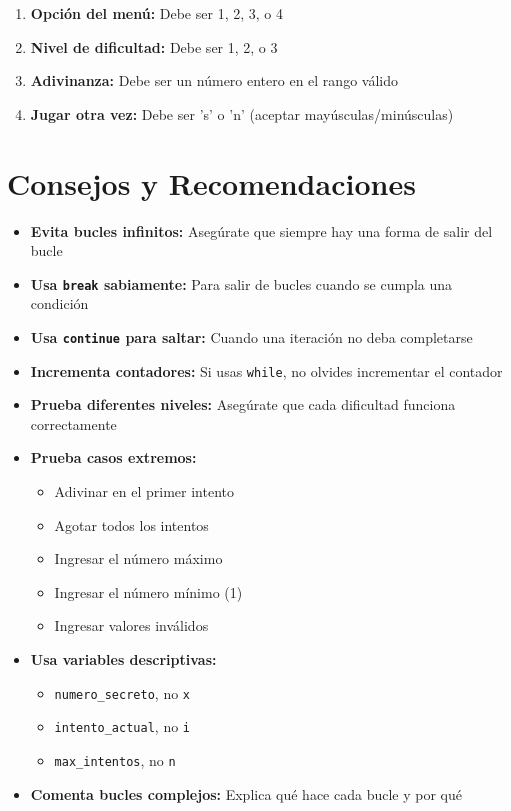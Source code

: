 \documentclass[12pt,a4paper]{article}
\begin{document}
\begin{enumerate}[leftmargin=*]
    \item \textbf{Opción del menú:} Debe ser 1, 2, 3, o 4
    \item \textbf{Nivel de dificultad:} Debe ser 1, 2, o 3
    \item \textbf{Adivinanza:} Debe ser un número entero en el rango válido
    \item \textbf{Jugar otra vez:} Debe ser 's' o 'n' (aceptar mayúsculas/minúsculas)
\end{enumerate}

\section{Consejos y Recomendaciones}

\begin{itemize}[leftmargin=*]
    \item \textbf{Evita bucles infinitos:} Asegúrate que siempre hay una forma de salir del bucle
    
    \item \textbf{Usa \texttt{break} sabiamente:} Para salir de bucles cuando se cumpla una condición
    
    \item \textbf{Usa \texttt{continue} para saltar:} Cuando una iteración no deba completarse
    
    \item \textbf{Incrementa contadores:} Si usas \texttt{while}, no olvides incrementar el contador
    
    \item \textbf{Prueba diferentes niveles:} Asegúrate que cada dificultad funciona correctamente
    
    \item \textbf{Prueba casos extremos:}
    \begin{itemize}
        \item Adivinar en el primer intento
        \item Agotar todos los intentos
        \item Ingresar el número máximo
        \item Ingresar el número mínimo (1)
        \item Ingresar valores inválidos
    \end{itemize}
    
    \item \textbf{Usa variables descriptivas:}
    \begin{itemize}
        \item \texttt{numero\_secreto}, no \texttt{x}
        \item \texttt{intento\_actual}, no \texttt{i}
        \item \texttt{max\_intentos}, no \texttt{n}
    \end{itemize}
    
    \item \textbf{Comenta bucles complejos:} Explica qué hace cada bucle y por qué
\end{itemize}
\end{document}
